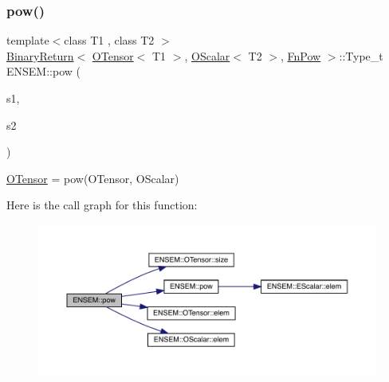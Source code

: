 \subsubsection{\texorpdfstring{pow()}{pow()}\hspace{0.1cm}{\footnotesize\ttfamily [2/3]}}
{\footnotesize\ttfamily template$<$class T1 , class T2 $>$ \\
\mbox{\hyperlink{structENSEM_1_1BinaryReturn}{Binary\+Return}}$<$ \mbox{\hyperlink{classENSEM_1_1OTensor}{O\+Tensor}}$<$ T1 $>$, \mbox{\hyperlink{classENSEM_1_1OScalar}{O\+Scalar}}$<$ T2 $>$, \mbox{\hyperlink{structENSEM_1_1FnPow}{Fn\+Pow}} $>$\+::Type\+\_\+t E\+N\+S\+E\+M\+::pow (\begin{DoxyParamCaption}\item[{const \mbox{\hyperlink{classENSEM_1_1OTensor}{O\+Tensor}}$<$ T1 $>$ \&}]{s1,  }\item[{const \mbox{\hyperlink{classENSEM_1_1OScalar}{O\+Scalar}}$<$ T2 $>$ \&}]{s2 }\end{DoxyParamCaption})\hspace{0.3cm}{\ttfamily [inline]}}



\mbox{\hyperlink{classENSEM_1_1OTensor}{O\+Tensor}} = pow(\+O\+Tensor, O\+Scalar) 

Here is the call graph for this function\+:\nopagebreak
\begin{figure}[H]
\begin{center}
\leavevmode
\includegraphics[width=350pt]{de/d87/group__obstensor_ga5d6fdaa96c08e10d2006c495cb0af217_cgraph}
\end{center}
\end{figure}
\mbox{\label{group__obstensor_ga5f02683bb668851c7df8a84ba438b0fb}} 
